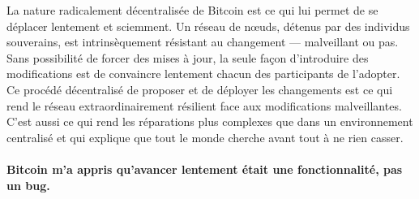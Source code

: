La nature radicalement décentralisée de Bitcoin est ce qui lui permet de se
déplacer lentement et sciemment. Un réseau de nœuds, détenus par des
individus souverains, est intrinsèquement résistant au changement ---
malveillant ou pas. Sans possibilité de forcer des mises à jour, la seule façon
d'introduire des modifications est de convaincre lentement chacun des
participants de l'adopter. Ce procédé décentralisé de proposer et de déployer
les changements est ce qui rend le réseau extraordinairement résilient face aux
modifications malveillantes. C'est aussi ce qui rend les réparations plus
complexes que dans un environnement centralisé et qui explique que tout le monde
cherche avant tout à ne rien casser.

\paragraph{Bitcoin m'a appris qu'avancer lentement était une fonctionnalité, pas
un bug.}

%
%
%
%
%
%
%
